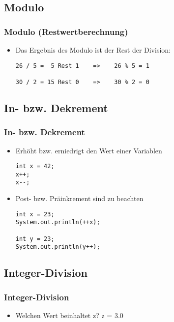 \documentclass[final]{beamer}
\begin{document}
\subsection{Modulo}
\begin{frame}[fragile]
  \frametitle{Modulo (Restwertberechnung)}
  \begin{itemize}
    \item Das Ergebnis des Modulo ist der Rest der Division:
    \begin{lstlisting}
26 / 5 =  5 Rest 1    =>    26 % 5 = 1

30 / 2 = 15 Rest 0    =>    30 % 2 = 0
    \end{lstlisting}
  \end{itemize}
\end{frame}

\subsection{In- bzw. Dekrement}
\begin{frame}[fragile]
  \frametitle{In- bzw. Dekrement}
  \begin{itemize}
    \item Erhöht bzw. erniedrigt den Wert einer Variablen
    \begin{lstlisting}
int x = 42;
x++; 
x--;
    \end{lstlisting}
    \item Post- bzw. Präinkrement sind zu beachten
    \begin{lstlisting}
int x = 23;
System.out.println(++x);

int y = 23;
System.out.println(y++);
    \end{lstlisting}
  \end{itemize}
\end{frame}

\subsection{Integer-Division}
\begin{frame}[fragile]
  \frametitle{Integer-Division}
  \begin{itemize}
    \begin{lstlisting}
int x = 7;

int y = 2;

double z = x / y;
    \end{lstlisting}
    \item[] Welchen Wert beinhaltet z? \qquad \pause z = 3.0
  \end{itemize}
\end{frame}
\end{document}
